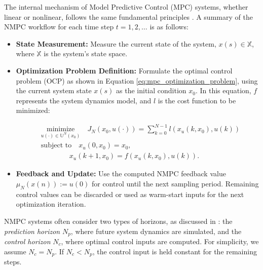The internal mechanism of Model Predictive Control (MPC) systems, whether linear or nonlinear, follows the same fundamental principles \cite{grune2017nonlinearmpc,schwenzer2021review}. A summary of the NMPC workflow for each time step \( t = 1, 2, \dots \) is as follows:

\begin{itemize}
    \item \textbf{State Measurement:} Measure the current state of the system, \( x(s) \in \mathbb{X} \), where \( \mathbb{X} \) is the system's state space.
    \item \textbf{Optimization Problem Definition:} Formulate the optimal control problem (OCP) as shown in Equation \ref{eq:mpc_optimization_problem}, using the current system state \( x(s) \) as the initial condition \( x_0 \). In this equation, \( f \) represents the system dynamics model, and \( l \) is the cost function to be minimized:

    \begin{equation}
        \begin{aligned}
            &\underset{u(\cdot) \in  \mathbb{U}^{N}(x_{0})}{\text{minimize}} \quad J_{N}(x_{0}, u(\cdot)) = \sum_{k=0}^{N-1} l(x_u(k, x_0), u(k)) \\
            &\text{subject to} \quad x_u(0, x_0) = x_0, \\
            &\quad \quad \quad \quad x_u(k+1, x_0) = f(x_u(k, x_0), u(k)).
        \end{aligned}
        \label{eq:mpc_optimization_problem}
    \end{equation}
    \item \textbf{Feedback and Update:} Use the computed NMPC feedback value \( \mu_{N}(x(n)) := u(0) \) for control until the next sampling period. Remaining control values can be discarded or used as warm-start inputs for the next optimization iteration.
\end{itemize}

NMPC systems often consider two types of horizons, as discussed in \cite{schwenzer2021review}: the \textit{prediction horizon} \( N_p \), where future system dynamics are simulated, and the \textit{control horizon} \( N_c \), where optimal control inputs are computed. For simplicity, we assume \( N_c = N_p \). If \( N_c < N_p \), the control input is held constant for the remaining steps.
